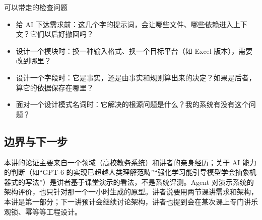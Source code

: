 \documentclass[a4paper]{article}
\begin{document}
\begin{importantbox}{可以带走的检查问题}
\begin{itemize}
  \item 给 AI 下达需求前：这几个字的提示词，会让哪些文件、哪些依赖进入上下文？它们以后好撤回吗？
  \item 设计一个模块时：换一种输入格式、换一个目标平台（如 Excel 版本），需要改到哪里？
  \item 设计一个字段时：它是事实，还是由事实和规则算出来的决定？如果是后者，算它的依据保存在哪里？
  \item 面对一个设计模式名词时：它解决的根源问题是什么？我的系统有没有这个问题？
\end{itemize}
\end{importantbox}

\subsection{边界与下一步}

本讲的论证主要来自一个领域（高校教务系统）和讲者的亲身经历；关于 AI 能力的判断（如“GPT-6 的实现已超越人类理解范畴”“强化学习能引导模型学会抽象机器式的写法”）是讲者基于课堂演示的看法，不是系统评测。Agent 对演示系统的架构评价，也只针对那一个一小时生成的原型。讲者说要用两节课讲需求和架构，本讲是第一部分；下一讲预计会继续讨论架构，讲者也提到会在某次课上专门讲乐观锁、幂等等工程设计。

\end{document}
